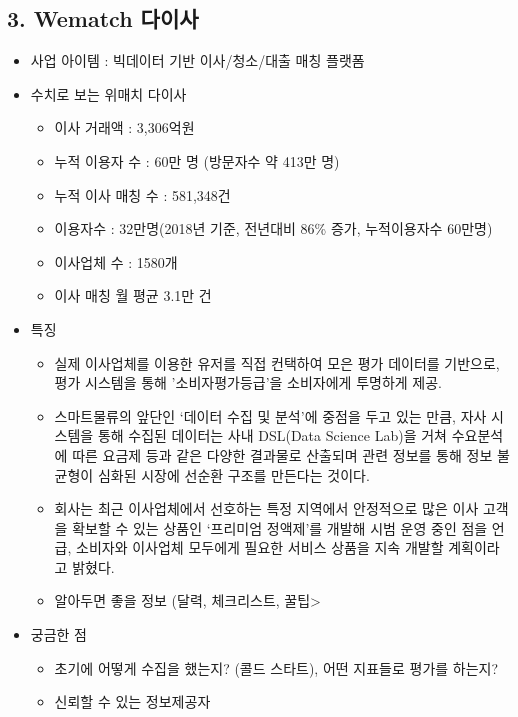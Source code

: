 \documentclass[11pt]{article}
\providecommand{\tightlist}{%
      \setlength{\itemsep}{0pt}\setlength{\parskip}{0pt}}
\begin{document}
\hypertarget{wematch-uxb2e4uxc774uxc0ac}{%
\subsection{3. Wematch 다이사}\label{wematch-uxb2e4uxc774uxc0ac}}

\begin{itemize}
\tightlist
\item
  사업 아이템 : 빅데이터 기반 이사/청소/대출 매칭 플랫폼
\item
  수치로 보는 위매치 다이사

  \begin{itemize}
  \tightlist
  \item
    이사 거래액 : 3,306억원
  \item
    누적 이용자 수 : 60만 명 (방문자수 약 413만 명)
  \item
    누적 이사 매칭 수 : 581,348건
  \item
    이용자수 : 32만명(2018년 기준, 전년대비 86\% 증가, 누적이용자수
    60만명)
  \item
    이사업체 수 : 1580개
  \item
    이사 매칭 월 평균 3.1만 건
  \end{itemize}
\item
  특징

  \begin{itemize}
  \item
    실제 이사업체를 이용한 유저를 직접 컨택하여 모은 평가 데이터를
    기반으로, 평가 시스템을 통해 '소비자평가등급'을 소비자에게 투명하게
    제공.
  \item
    스마트물류의 앞단인 `데이터 수집 및 분석'에 중점을 두고 있는 만큼,
    자사 시스템을 통해 수집된 데이터는 사내 DSL(Data Science Lab)을 거쳐
    수요분석에 따른 요금제 등과 같은 다양한 결과물로 산출되며 관련
    정보를 통해 정보 불균형이 심화된 시장에 선순환 구조를 만든다는
    것이다.
  \item
    회사는 최근 이사업체에서 선호하는 특정 지역에서 안정적으로 많은 이사
    고객을 확보할 수 있는 상품인 `프리미엄 정액제'를 개발해 시범 운영
    중인 점을 언급, 소비자와 이사업체 모두에게 필요한 서비스 상품을 지속
    개발할 계획이라고 밝혔다.
  \item
    알아두면 좋을 정보 (달력, 체크리스트, 꿀팁\textgreater{}
  \end{itemize}
\item
  궁금한 점

  \begin{itemize}
  \tightlist
  \item
    초기에 어떻게 수집을 했는지? (콜드 스타트), 어떤 지표들로 평가를
    하는지?
  \item
    신뢰할 수 있는 정보제공자
  \end{itemize}
\end{itemize}
\end{document}
